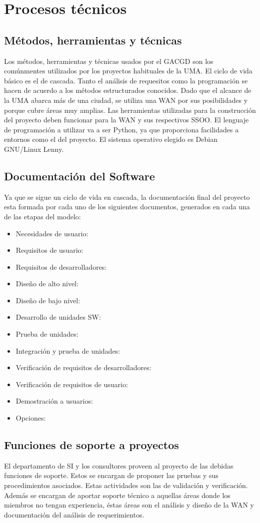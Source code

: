 \documentclass[11pt,a4paper,spanish,twoside]{report}
\begin{document}
\chapter{Procesos técnicos}
\section{Métodos, herramientas y técnicas}
Los métodos, herramientas y técnicas usados por el GACGD son los comúnmentes 
utilizados por los proyectos habituales de la UMA. El ciclo de vida básico es 
el de cascada. Tanto el análisis de requesitos como la programación se hacen 
de acuerdo a los métodos estructurados conocidos. Dado que el alcance de la 
UMA abarca más de una ciudad, se utiliza una WAN por sus posibilidades y 
porque cubre áreas muy amplias. Las herramientas utilizadas para la 
construcción del proyecto deben funcionar para la WAN y sus respectivos SSOO. 
El lenguaje de programación a utilizar va a ser Python, ya que proporciona 
facilidades a entornos como el del proyecto. El sistema operativo elegido es 
Debian GNU/Linux Lenny.

\section{Documentación del Software}
Ya que se sigue un ciclo de vida en cascada, la documentación final del 
proyecto esta formada por cada uno de los siguientes documentos, generados en 
cada una de las etapas del modelo:

\begin{itemize}
\item Necesidades de usuario:
\item Requisitos de usuario:
\item Requisitos de desarrolladores:
\item Diseño de alto nivel:
\item Diseño de bajo nivel:
\item Desarrollo de unidades SW:
\item Prueba de unidades:
\item Integración y prueba de unidades:
\item Verificación de requisitos de desarrolladores:
\item Verificación de requisitos de usuario:
\item Demostración a usuarios:
\item Opciones:
\end{itemize}

\section{Funciones de soporte a proyectos}
El departamento de SI y los consultores proveen al proyecto de las debidas 
funciones de soporte. Estos se encargan de proponer las pruebas y sus 
procedimientos asociados. Estas actividades son las de validación y 
verificación. Además se encargan de aportar soporte técnico a aquellas áreas 
donde los miembros no tengan experiencia, éstas áreas son el análisis y diseño 
de la WAN y documentación del análisis de requerimientos.
\end{document}
